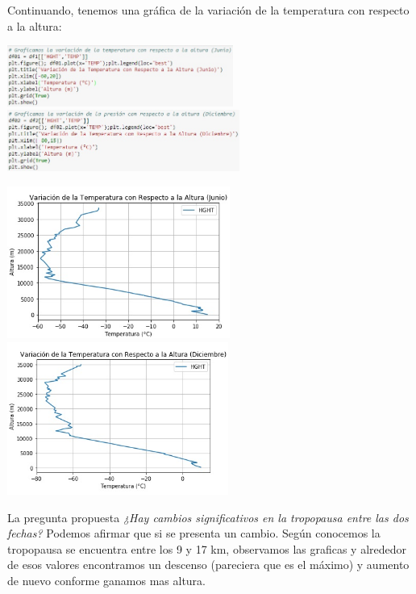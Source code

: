 \documentclass[12pt]{article}
\begin{document}
Continuando, tenemos una gráfica de la variación de la temperatura con respecto a la altura:
\begin{center}
	\includegraphics[height=2cm]{dj2.jpg} \hspace*{\fill}
    \includegraphics[height=2cm]{dd2.jpg}
\end{center}
\begin{center}
	\includegraphics[height=5cm]{gj2.jpg}  \hspace*{\fill}
    \includegraphics[height=5cm]{gd2.jpg}
\end{center}
La pregunta propuesta  \textit{¿Hay cambios significativos en la tropopausa entre las dos fechas?} Podemos afirmar que si se presenta un cambio. Según conocemos la tropopausa se encuentra entre los 9 y 17 km, observamos las graficas y alrededor de esos valores encontramos un descenso (pareciera que es el máximo) y aumento de nuevo conforme ganamos mas altura. \\
\end{document}
